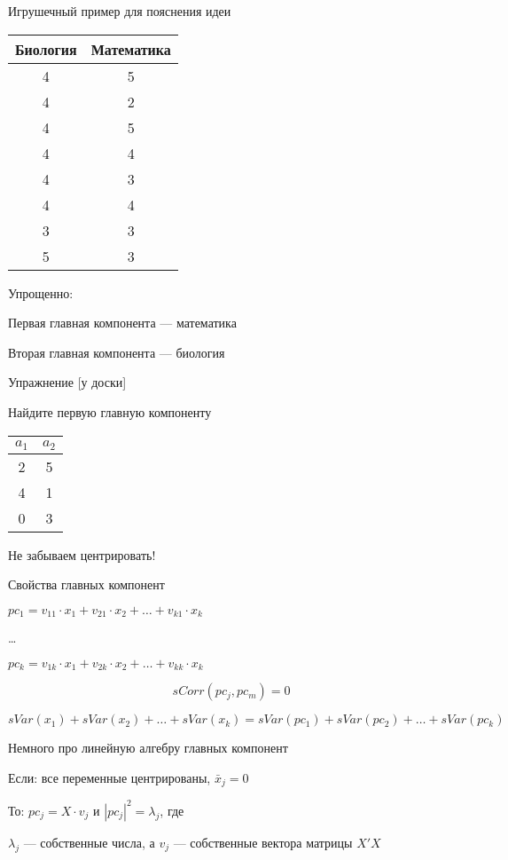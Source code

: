 \documentclass[russian,ignorenonframetext,]{beamer}
\begin{document}
\begin{frame}{Игрушечный пример для пояснения идеи}

\begin{tabular}{cc}
Биология & Математика \\ 
\hline 
4 & 5 \\ 
4 & 2 \\ 
4 & 5 \\ 
4 & 4 \\ 
4 & 3 \\ 
4 & 4 \\ 
3 & 3 \\ 
5 & 3 \\ 
\end{tabular}

Упрощенно:

Первая главная компонента --- математика

Вторая главная компонента --- биология

\end{frame}

\begin{frame}{Упражнение {[}у доски{]}}

Найдите первую главную компоненту

\begin{tabular}{cc}
$a_1$ & $a_2$ \\ 
\hline 
2 & 5 \\ 
4 & 1 \\ 
0 & 3 \\ 
\end{tabular}

Не забываем центрировать!

\end{frame}

\begin{frame}{Свойства главных компонент}

\(pc_1=v_{11} \cdot x_1 + v_{21} \cdot x_2 + \ldots + v_{k1} \cdot x_k\)

\ldots{}

\(pc_k=v_{1k} \cdot x_1 + v_{2k} \cdot x_2 + \ldots + v_{kk} \cdot x_k\)

\[
sCorr(pc_j,pc_m)=0
\]

\[
sVar(x_1)+ sVar(x_2) + \ldots + sVar(x_k) =
sVar(pc_1)+ sVar(pc_2) + \ldots + sVar(pc_k)
\]

\end{frame}

\begin{frame}{Немного про линейную алгебру главных компонент}

Если: все переменные центрированы, \(\bar{x}_j=0\)

То: \(pc_j=X \cdot v_j\) и \(|pc_j|^2=\lambda_j\), где

\(\lambda_j\) --- собственные числа, а \(v_{j}\) --- собственные вектора
матрицы \(X'X\)

\end{frame}
\end{document}
